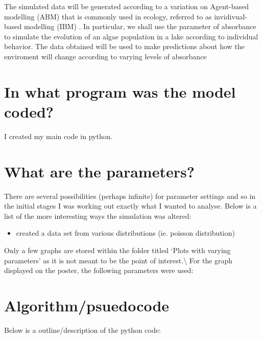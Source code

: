 \documentclass[]{article}
\begin{document}
The simulated data will be generated according to a variation on
Agent-based modelling (ABM) that is commonly used in ecology, referred
to as invidivual-based modelling (IBM) . In particular, we shall use the
parameter of absorbance to simulate the evolution of an algae population
in a lake according to individual behavior. The data obtained will be
used to make predictions about how the enviroment will change according
to varying levels of absorbance

\section{In what program was the model
coded?}\label{in-what-program-was-the-model-coded}

I created my main code in python.

\section{What are the parameters?}\label{what-are-the-parameters}

There are several possibilities (perhaps infinite) for parameter
settings and so in the initial stages I was working out exactly what I
wanted to analyse. Below is a list of the more interesting ways the
simulation was altered:

\begin{itemize}
    \item created a data set from various distributions (ie. poisson distribution)
\end{itemize}

Only a few graphs are stored within the folder titled `Plots with
varying parameters' as it is not meant to be the point of
interest.\textbackslash{} For the graph displayed on the poster, the
following parameters were used:

\section{Algorithm/psuedocode}\label{algorithmpsuedocode}

Below is a outline/description of the python code:
\end{document}
